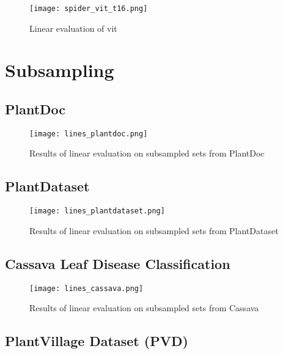 \begin{figure}[H]
    \begin{center}
    \texttt{[image: spider\_vit\_t16.png]}
    \caption{Linear evaluation of \gls{vit}}\label{fig:spider_vit_t16}
    \end{center}
\end{figure}


\section{Subsampling}
\subsection{PlantDoc}

\begin{figure}[H]
    \begin{center}
    \texttt{[image: lines\_plantdoc.png]}
    \caption{Results of linear evaluation on subsampled sets from PlantDoc}\label{fig:lines_plantdoc}
    \end{center}
\end{figure}

\subsection{PlantDataset}

\begin{figure}[H]
    \begin{center}
    \texttt{[image: lines\_plantdataset.png]}
    \caption{Results of linear evaluation on subsampled sets from PlantDataset}\label{fig:lines_plantdataset}
    \end{center}
\end{figure}

\subsection{Cassava Leaf Disease Classification}

\begin{figure}[H]
    \begin{center}
    \texttt{[image: lines\_cassava.png]}
    \caption{Results of linear evaluation on subsampled sets from Cassava}\label{fig:lines_cassava}
    \end{center}
\end{figure}

\subsection{PlantVillage Dataset (PVD)}

